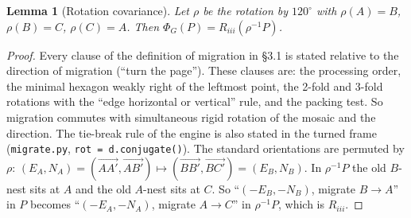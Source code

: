 \documentclass[11pt]{article}
\newtheorem{lemma}[theorem]{Lemma}
\theoremstyle{definition}
\begin{document}
\begin{lemma}[Rotation covariance]\label{lem:rot}
Let $\rho$ be the rotation by $120^\circ$ with $\rho(A)=B$, $\rho(B)=C$, $\rho(C)=A$. Then
$\Phi_G(P)=R_{iii}(\rho^{-1}P)$.
\end{lemma}
\begin{proof}
Every clause of the definition of migration in \S3.1 is stated relative to the direction of migration (``turn the page'').
These clauses are: the processing order, the minimal hexagon weakly right of the leftmost point, the 2-fold and 3-fold
rotations with the ``edge horizontal or vertical'' rule, and the packing test. So migration commutes with simultaneous
rigid rotation of the mosaic and the direction. The tie-break rule of the engine is also stated in the turned frame
(\texttt{migrate.py}, \texttt{rot = d.conjugate()}). The standard orientations are permuted by $\rho$:
$(E_A,N_A)=(\vec{AA'},\vec{AB'})\mapsto(\vec{BB'},\vec{BC'})=(E_B,N_B)$. In $\rho^{-1}P$ the old $B$-nest sits at $A$
and the old $A$-nest sits at $C$. So ``$(-E_B,-N_B)$, migrate $B\to A$'' in $P$ becomes
``$(-E_A,-N_A)$, migrate $A\to C$'' in $\rho^{-1}P$, which is $R_{iii}$.
\end{proof}
\end{document}
